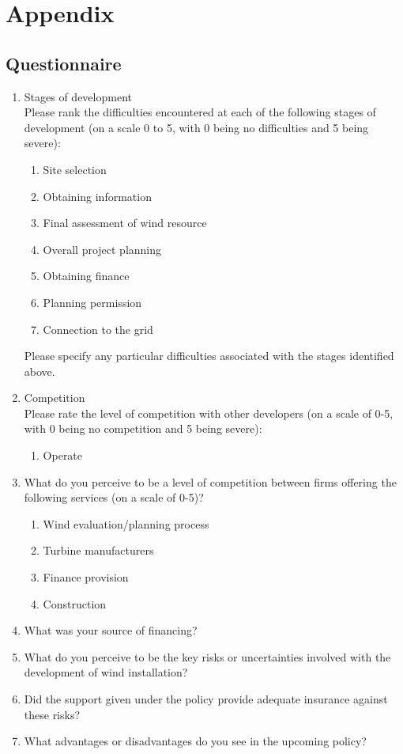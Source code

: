 \documentclass[a4paper, 12pt]{article}
\begin{document}
%

{\footnotesize
}

\newpage

\section{Appendix}

\subsection{Questionnaire}
\begin{enumerate}
	\item{Stages of development} \hfill \\
	Please rank the difficulties encountered at each of the following stages of development (on a scale 0 to 5, with 0 being no difficulties and 5 being severe):
	\begin{enumerate}
		\item Site selection
		\item Obtaining information
		\item Final assessment of wind resource
		\item Overall project planning
		\item Obtaining finance
		\item Planning permission
		\item Connection to the grid
	\end{enumerate}
	Please specify any particular difficulties associated with the stages identified above.
	
	\item{Competition} \hfill \\
	Please rate the level of competition with other developers (on a scale of 0-5, with 0 being no competition and 5 being severe):
	\begin{enumerate}
		\item Operate
	\end{enumerate}

	\item What do you perceive to be a level of competition between firms offering the following services (on a scale of 0-5)?
	\begin{enumerate}
		\item Wind evaluation/planning process
		\item Turbine manufacturers
		\item Finance provision
		\item Construction
	\end{enumerate}
	
	\item What was your source of financing?
	\item What do you perceive to be the key risks or uncertainties involved with the development of wind installation?
	\item Did the support given under the policy provide adequate insurance against these risks?
	\item What advantages or disadvantages do you see in the upcoming policy?
\end{enumerate}
\end{document}
